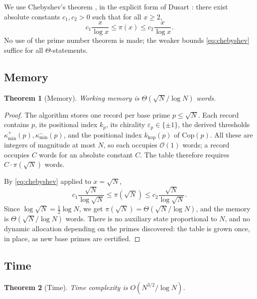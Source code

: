 \documentclass[11pt]{amsart}
\numberwithin{equation}{section}
\theoremstyle{plain}
\newtheorem{theorem}{Theorem}[section]
\theoremstyle{definition}
\begin{document}
We use Chebyshev's theorem \cite{Chebyshev1852}, in the explicit form
of Dusart \cite{Dusart2010}: there exist absolute constants
$c_1,c_2>0$ such that for all $x\ge 2$,
\begin{equation}
c_1\frac{x}{\log x}\le\pi(x)\le c_2\frac{x}{\log x}.
\label{eq:chebyshev}
\end{equation}
No use of the prime number theorem is made; the weaker bounds
\eqref{eq:chebyshev} suffice for all $\Theta$-statements.

\subsection{Memory}
\label{subsec:complexity-memory}

\begin{theorem}[Memory]
\label{thm:mem}
Working memory is $\Theta(\sqrt{N}/\log N)$ words.
\end{theorem}

\begin{proof}
The algorithm stores one record per base prime $p\le\sqrt{N}$. Each
record contains $p$, its positional index $k_p$, its chirality
$\varepsilon_p\in\{\pm 1\}$, the derived thresholds
$\kappa_{\min}^{+}(p),\kappa_{\min}^{-}(p)$, and the positional index
$k_{\mathrm{kop}}(p)$ of $\mathrm{Cop}(p)$. All these are integers of
magnitude at most $N$, so each occupies $\mathcal{O}(1)$ words; a
record occupies $C$ words for an absolute constant $C$. The table
therefore requires $C\cdot\pi(\sqrt{N})$ words.

By \eqref{eq:chebyshev} applied to $x=\sqrt{N}$,
\begin{equation*}
c_1\frac{\sqrt{N}}{\log\sqrt{N}}\le\pi(\sqrt{N})\le
c_2\frac{\sqrt{N}}{\log\sqrt{N}}.
\end{equation*}
Since $\log\sqrt{N}=\tfrac12\log N$, we get
$\pi(\sqrt{N})=\Theta(\sqrt{N}/\log N)$, and the memory is
$\Theta(\sqrt{N}/\log N)$ words. There is no auxiliary state
proportional to $N$, and no dynamic allocation depending on the primes
discovered: the table is grown once, in place, as new base primes are
certified.
\end{proof}

\subsection{Time}
\label{subsec:complexity-time}

\begin{theorem}[Time]
\label{thm:time}
Time complexity is $O(N^{3/2}/\log N)$.
\end{theorem}
\end{document}
